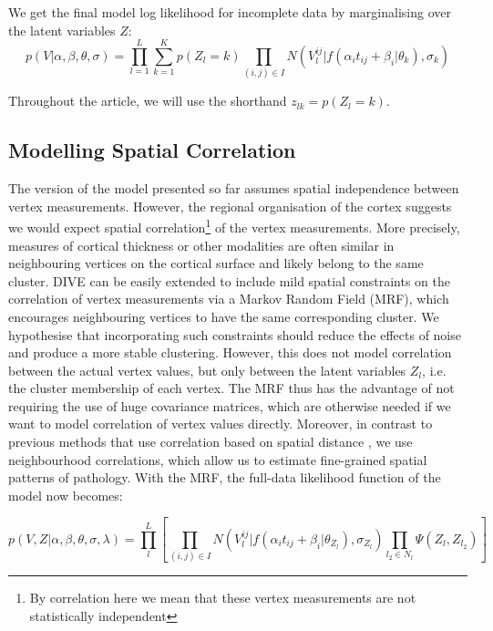 We get the final model log likelihood for incomplete data by marginalising over the latent variables $Z$:
\begin{equation}
\label{eq:dps_vwdpm6}
 p(V|\alpha, \beta, \theta, \sigma) = \prod_{l=1}^L \sum_{k=1}^K p(Z_l = k) \prod_{(i,j) \in I} N(V_l^{ij} | f(\alpha_i t_{ij} + \beta_i | \theta_k), \sigma_k)
\end{equation}

Throughout the article, we will use the shorthand $z_{lk} = p(Z_l = k)$.

\subsection{Modelling Spatial Correlation}
\label{sec:diveSpatialCorr}

The version of the model presented so far assumes spatial independence between vertex measurements. However, the regional organisation of the cortex suggests we would expect spatial correlation\footnote{By correlation here we mean that these vertex measurements are not statistically independent} of the vertex measurements. More precisely, measures of cortical thickness or other modalities are often similar in neighbouring vertices on the cortical surface and likely belong to the same cluster. DIVE can be easily extended to include mild spatial constraints on the correlation of vertex measurements via a Markov Random Field (MRF), which encourages neighbouring vertices to have the same corresponding cluster. We hypothesise that incorporating such constraints should reduce the effects of noise and produce a more stable clustering. However, this does not model correlation between the actual vertex values, but only between the latent variables $Z_l$, i.e. the cluster membership of each vertex. The MRF thus has the advantage of not requiring the use of huge covariance matrices, which are otherwise needed if we want to model correlation of vertex values directly. Moreover, in contrast to previous methods that use correlation based on spatial distance \cite{bilgel2016multivariate,koval2017statistical}, we use neighbourhood correlations, which allow us to estimate fine-grained spatial patterns of pathology. With the MRF, the full-data likelihood function of the model now becomes:

\begin{equation}
 p(V, Z | \alpha, \beta, \theta, \sigma, \lambda) = \prod_l^L \left[ \prod_{(i,j) \in I} N(V_l^{ij} | f(\alpha_i t_{ij} + \beta_i | \theta_{Z_l}), \sigma_{Z_l}) \prod_{l_2 \in N_l} \Psi (Z_{l}, Z_{l_2}) \right]
\end{equation}

